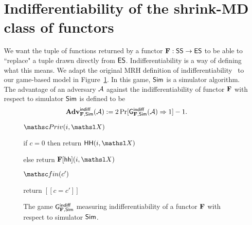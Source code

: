 \section{Indifferentiability of the shrink-MD class of functors}
\label{sec-chop}
We want the tuple of functions returned by a functor $\mathbf{F}: \mathsf{SS} \to \mathsf{ES}$ to be able to ``replace" a tuple drawn directly from $\mathsf{ES}$. 
Indifferentiability is a way of defining what this means.  
We adapt the original MRH definition of indifferentiability~\cite{TCC:MauRenHol04} to our game-based model in Figure~\ref{fig-gm-indiff}.
In this game, $\mathsf{Sim}$ is a simulator algorithm. 
The advantage of an adversary $\mathcal{A}$ against the indifferentiability of functor $\mathbf{F}$ with respect to simulator $\mathsf{Sim}$ is defined to be 
\[\mathbf{Adv}^{\mathrm{\mathsf{indiff}}}_{\mathbf{F},\mathsf{Sim}}(\mathcal{A}) := 2\Pr[\mathsf{G}^{\mathsf{indiff}}_{\mathbf{F},\mathsf{Sim}}(\mathcal{A}) \Rightarrow 1] - 1.\]

\begin{figure}
	
	{	\ExptSepSpace
		\begin{algorithm}{$\PrivO(i,\XEDSA)$}
			\item if $c = 0$ then return $\HH(i, \XEDSA)$
			\item else return $\construct{F}[\hh](i, \XEDSA)$
		\end{algorithm}	
		\ExptSepSpace
		\begin{algorithm}{$\Finalize(c')$}
			\item return $[[c = c']]$
		\end{algorithm}
	}
	\vspace{5pt}
	\caption{The game  $\mathsf{G}^{\mathsf{indiff}}_{\mathbf{F}, \mathsf{Sim}}$ measuring indifferentiability of a functor $\mathbf{F}$ with respect to simulator $\mathsf{Sim}$.}
	\label{fig-gm-indiff}
\end{figure}



